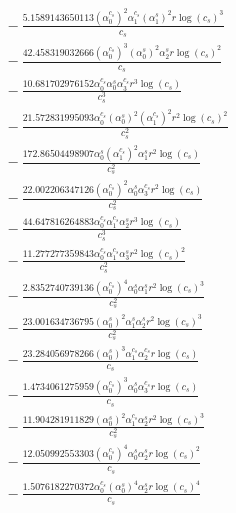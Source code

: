 \documentclass[10pt]{article}
\begin{document}
\begin{align*}
&{}  - \frac{5.1589143650113 \left(\alpha_{0}^{c_s}\right)^{2} \alpha_{1}^{c_s} \left(\alpha_{1}^s\right)^{2} r \log{\left(c_{s} \right)}^{3}}{c_{s}} \\
&{}  - \frac{42.458319032666 \left(\alpha_{0}^{c_s}\right)^{3} \left(\alpha_{0}^s\right)^{2} \alpha_{2}^s r \log{\left(c_{s} \right)}^{2}}{c_{s}} \\
&{}  - \frac{10.681702976152 \alpha_{0}^{c_s} \alpha_{0}^s \alpha_{3}^{c_s} r^{3} \log{\left(c_{s} \right)}}{c_{s}^{3}} \\
&{}  - \frac{21.572831995093 \alpha_{0}^{c_s} \left(\alpha_{0}^s\right)^{2} \left(\alpha_{1}^{c_s}\right)^{2} r^{2} \log{\left(c_{s} \right)}^{2}}{c_{s}^{2}} \\
&{}  - \frac{172.86504498907 \alpha_{0}^s \left(\alpha_{1}^{c_s}\right)^{2} \alpha_{1}^s r^{2} \log{\left(c_{s} \right)}}{c_{s}^{2}} \\
&{}  - \frac{22.002206347126 \left(\alpha_{0}^{c_s}\right)^{2} \alpha_{0}^s \alpha_{3}^{c_s} r^{2} \log{\left(c_{s} \right)}}{c_{s}^{2}} \\
&{}  - \frac{44.647816264883 \alpha_{0}^{c_s} \alpha_{1}^{c_s} \alpha_{2}^s r^{3} \log{\left(c_{s} \right)}}{c_{s}^{3}} \\
&{}  - \frac{11.277277359843 \alpha_{0}^{c_s} \alpha_{1}^{c_s} \alpha_{3}^s r^{2} \log{\left(c_{s} \right)}^{2}}{c_{s}^{2}} \\
&{}  - \frac{2.8352740739136 \left(\alpha_{0}^{c_s}\right)^{4} \alpha_{0}^s \alpha_{1}^s r^{2} \log{\left(c_{s} \right)}^{3}}{c_{s}^{2}} \\
&{}  - \frac{23.001634736795 \left(\alpha_{0}^s\right)^{2} \alpha_{1}^s \alpha_{2}^s r^{2} \log{\left(c_{s} \right)}^{3}}{c_{s}^{2}} \\
&{}  - \frac{23.284056978266 \left(\alpha_{0}^s\right)^{3} \alpha_{1}^{c_s} \alpha_{2}^{c_s} r \log{\left(c_{s} \right)}}{c_{s}} \\
&{}  - \frac{1.4734061275959 \left(\alpha_{0}^{c_s}\right)^{3} \alpha_{0}^s \alpha_{3}^{c_s} r \log{\left(c_{s} \right)}}{c_{s}} \\
&{}  - \frac{11.904281911829 \left(\alpha_{0}^s\right)^{2} \alpha_{1}^{c_s} \alpha_{2}^s r^{2} \log{\left(c_{s} \right)}^{3}}{c_{s}^{2}} \\
&{}  - \frac{12.050992553303 \left(\alpha_{0}^{c_s}\right)^{4} \alpha_{0}^s \alpha_{2}^s r \log{\left(c_{s} \right)}^{2}}{c_{s}} \\
&{}  - \frac{1.5076182270372 \alpha_{0}^{c_s} \left(\alpha_{0}^s\right)^{4} \alpha_{2}^s r \log{\left(c_{s} \right)}^{4}}{c_{s}} \\

\end{align*}
\end{document}
